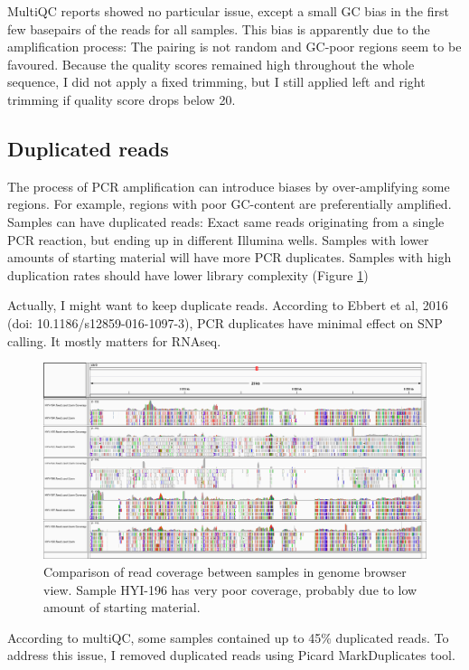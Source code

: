 \documentclass[10pt,a4paper]{report}
\begin{document}
MultiQC reports showed no particular issue, except a small GC bias in the first few basepairs of the reads for all samples. This bias is apparently due to the amplification process: The pairing is not random and GC-poor regions seem to be favoured. Because the quality scores remained high throughout the whole sequence, I did not apply a fixed trimming, but I still applied left and right trimming if quality score drops below 20.

\subsection{Duplicated reads}
The process of PCR amplification can introduce biases by over-amplifying some regions. For example, regions with poor GC-content are preferentially amplified. Samples can have duplicated reads: Exact same reads originating from a single PCR reaction, but ending up in different Illumina wells. Samples with lower amounts of starting material will have more PCR duplicates. Samples with high duplication rates should have lower library complexity (Figure \ref{PCR_dup})

Actually, I might want to keep duplicate reads. According to Ebbert et al, 2016 (doi: 10.1186/s12859-016-1097-3), PCR duplicates have minimal effect on SNP calling. It mostly matters for RNAseq.

\begin{figure}
\includegraphics[width=\textwidth]{nucleo_div_wgs/qc/sample_comp.png}
\caption{Comparison of read coverage between samples in genome browser view. Sample HYI-196 has very poor coverage, probably due to low amount of starting material.}
\label{PCR_dup}
\end{figure}

According to multiQC, some samples contained up to 45\% duplicated reads. To address this issue, I removed duplicated reads using Picard MarkDuplicates tool.
\end{document}
